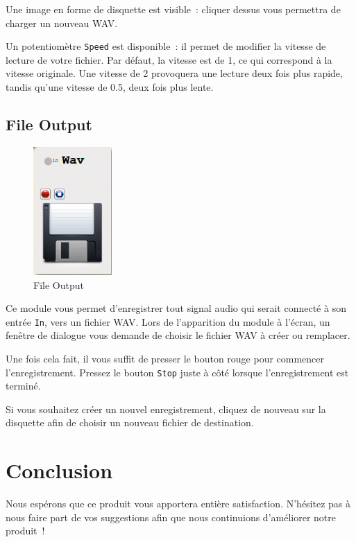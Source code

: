 \documentclass[a4paper,oneside,frenchb,10pt]{article}
\begin{document}
Une image en forme de disquette est visible~: cliquer dessus vous
permettra de charger un nouveau WAV.

Un potentiomètre \verb!Speed! est disponible~: il permet de modifier la
vitesse de lecture de votre fichier. Par défaut, la vitesse est de 1, ce
qui correspond à la vitesse originale. Une vitesse de 2 provoquera une
lecture deux fois plus rapide, tandis qu'une vitesse de 0.5, deux fois
plus lente.

\subsection{File Output}

\begin{multicols}{2}
\begin{figure}[H]
\centering
\includegraphics[width=3cm]{../img/png/wavrecorder.png}
\caption{File Output}
\end{figure}

Ce module vous permet d'enregistrer tout signal audio qui serait
connecté à son entrée \verb!In!, vers un fichier WAV. Lors de
l'apparition du module à l'écran, un fenêtre de dialogue vous demande de
choisir le fichier WAV à créer ou remplacer.

Une fois cela fait, il vous
suffit de presser le bouton rouge pour commencer l'enregistrement.
Pressez le bouton \verb!Stop! juste à côté lorsque l'enregistrement est
terminé.

Si vous souhaitez créer un nouvel enregistrement, cliquez de nouveau sur
la disquette afin de choisir un nouveau fichier de destination.

\end{multicols}

\section{Conclusion}

Nous espérons que ce produit vous apportera entière satisfaction.
N'hésitez pas à nous faire part de vos suggestions afin que nous
continuions d'améliorer notre produit~!
\end{document}
